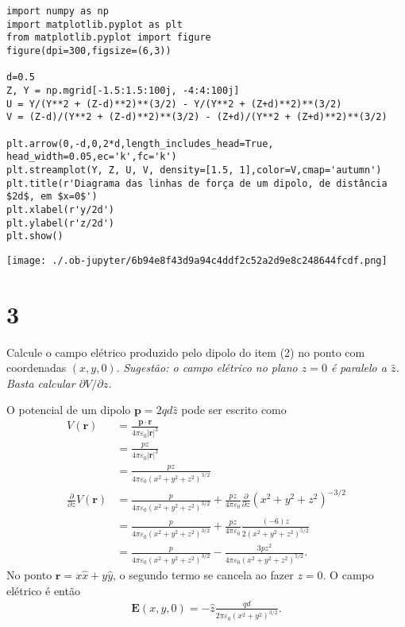 \documentclass[11pt]{article}
\begin{document}
\begin{verbatim}
import numpy as np
import matplotlib.pyplot as plt
from matplotlib.pyplot import figure
figure(dpi=300,figsize=(6,3))

d=0.5
Z, Y = np.mgrid[-1.5:1.5:100j, -4:4:100j] 
U = Y/(Y**2 + (Z-d)**2)**(3/2) - Y/(Y**2 + (Z+d)**2)**(3/2) 
V = (Z-d)/(Y**2 + (Z-d)**2)**(3/2) - (Z+d)/(Y**2 + (Z+d)**2)**(3/2) 

plt.arrow(0,-d,0,2*d,length_includes_head=True, head_width=0.05,ec='k',fc='k')
plt.streamplot(Y, Z, U, V, density=[1.5, 1],color=V,cmap='autumn')
plt.title(r'Diagrama das linhas de força de um dipolo, de distância $2d$, em $x=0$')
plt.xlabel(r'y/2d')
plt.ylabel(r'z/2d')
plt.show()
\end{verbatim}

\begin{center}
\texttt{[image: ./.ob-jupyter/6b94e8f43d9a94c4ddf2c52a2d9e8c248644fcdf.png]}
\end{center}

\section{3}
\label{sec:org551563f}
Calcule o campo elétrico produzido pelo dipolo do item (2) no ponto com
coordenadas \((x,y,0)\). \emph{Sugestão: o campo elétrico no plano \(z=0\) é}
\emph{paralelo a \(\hat z\). Basta calcular \(\partial V / \partial z\).}

O potencial de um dipolo \(\mathbf p=2qd\hat z\) pode ser escrito como
\begin{align}
  V(\mathbf r) &= \frac{\mathbf p\cdot\mathbf r}{4\pi\varepsilon_0|\mathbf r|^3}\\
               &= \frac{pz}{4\pi\varepsilon_0|\mathbf r|^3}\\
               &= \frac{pz}{4\pi\varepsilon_0(x^2+y^2+z^2)^{3/2}}\\
  \frac{\partial}{\partial z}V(\mathbf r) &= \frac{p}{4\pi\varepsilon_0(x^2+y^2+z^2)^{3/2}} +
                              \frac{pz}{4\pi\varepsilon_0}\frac{\partial}{\partial
                              z}(x^2+y^2+z^2)^{-3/2}\\  
               &= \frac{p}{4\pi\varepsilon_0(x^2+y^2+z^2)^{3/2}} +
                              \frac{pz}{4\pi\varepsilon_0}\frac{(-6)z}{2(x^2+y^2+z^2)^{5/2}}\\
               &= \frac{p}{4\pi\varepsilon_0(x^2+y^2+z^2)^{3/2}} -
                              \frac{3pz^2}{4\pi\varepsilon_0(x^2+y^2+z^2)^{5/2}}.\label{eq:3}
\end{align}
No ponto \(\mathbf r=x\hat x+y\hat y\), o segundo termo se cancela ao
fazer \(z=0\). O campo elétrico é então
\begin{align}
  \mathbf E(x,y,0) = -\hat z \frac{qd}{2\pi\varepsilon_0(x^2+y^2)^{3/2}}.
\end{align}
\end{document}

